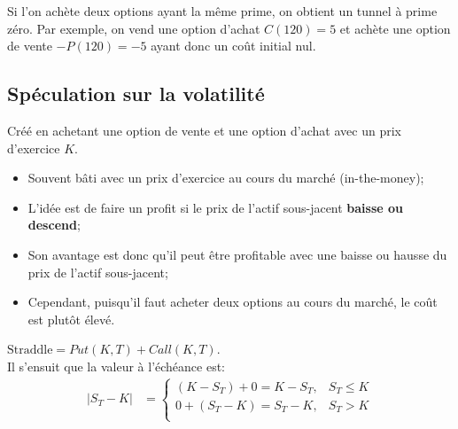 \documentclass[10pt, french]{article}
\begin{document}
\begin{multicols*}{2}
\begin{definitionNOHFILL}
Si l'on achète deux options ayant la même prime, on obtient un tunnel à prime zéro. Par exemple, on vend une option d'achat $C(120) = 5$ et achète une option de vente $-P(120) = -5$ ayant donc un coût initial nul.
\end{definitionNOHFILL}

\columnbreak
\subsection{Spéculation sur la volatilité}
\begin{definitionNOHFILL}
Créé en achetant une option de vente et une option d'achat avec un prix d'exercice $K$.

\begin{distributions}[Contexte]
\begin{itemize}[leftmargin = *]
	\item	Souvent bâti avec un prix d'exercice au cours du marché (in-the-money);
	\item	L'idée est de faire un profit si le prix de l'actif sous-jacent \textbf{baisse ou descend};
	\item	Son avantage est donc qu'il peut être profitable avec une baisse ou hausse du prix de l'actif sous-jacent;
	\item	Cependant, puisqu'il faut acheter deux options au cours du marché, le coût est plutôt élevé.
\end{itemize}
\end{distributions}

$\text{Straddle} = Put(K, T) + Call(K, T)$.\\

Il s'ensuit que la valeur à l'échéance est:
\begin{align*}
	|S_{T} - K|	
	&=	
		\begin{cases}
		(K - S_{T})	+	0	=	K - S_{T},	&	S_{T} \le K	\\
		0	+	(S_{T} - K)	=	S_{T} - K,	&	S_{T} >	K	\\
		\end{cases}
\end{align*}

\begin{center}
\begin{tikzpicture}[x=0.75pt,y=0.75pt,yscale=-1,xscale=1]


\end{tikzpicture}
\end{center}
\end{definitionNOHFILL}
\end{multicols*}
\end{document}
